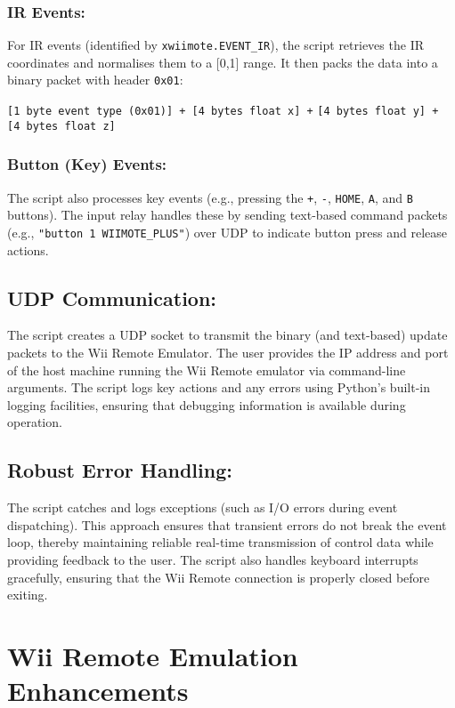 \subsubsection{IR Events:}
For IR events (identified by \texttt{xwiimote.EVENT\_IR}), the script retrieves the IR coordinates and normalises them to a [0,1] range. It then packs the data into a binary packet with header \texttt{0x01}:
\begin{center}
	\texttt{[1 byte event type (0x01)] + [4 bytes float x] +}
	\texttt{[4 bytes float y] + [4 bytes float z]}
\end{center}

\subsubsection{Button (Key) Events:}
The script also processes key events (e.g., pressing the \texttt{+}, \texttt{-}, \texttt{HOME}, \texttt{A}, and \texttt{B} buttons). The input relay handles these by sending text-based command packets (e.g., \texttt{"button 1 WIIMOTE\_PLUS"}) over UDP to indicate button press and release actions.

\subsection{UDP Communication:}
The script creates a UDP socket to transmit the binary (and text-based) update packets to the Wii Remote Emulator. The user provides the IP address and port of the host machine running the Wii Remote emulator via command-line arguments. The script logs key actions and any errors using Python’s built-in logging facilities, ensuring that debugging information is available during operation.

\subsection{Robust Error Handling:}
The script catches and logs exceptions (such as I/O errors during event dispatching). This approach ensures that transient errors do not break the event loop, thereby maintaining reliable real-time transmission of control data while providing feedback to the user. The script also handles keyboard interrupts gracefully, ensuring that the Wii Remote connection is properly closed before exiting.

\section{Wii Remote Emulation Enhancements}

